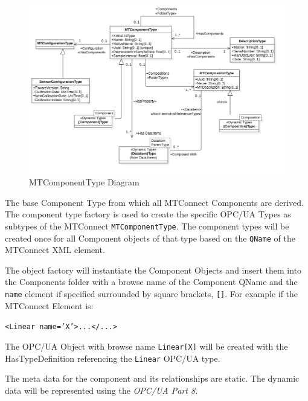\FloatBarrier

\begin{figure}[ht]
  \centering
    \includegraphics[width=1.0\textwidth]{./diagrams/MTComponentType.png}
  \caption{MTComponentType Diagram}
  \label{fig:MTComponentType}
\end{figure}

\FloatBarrier


The base Component Type from which all MTConnect Components are derived. The 
component type factory is used to create the specific OPC/UA Types as subtypes of the 
MTConnect \texttt{MTComponentType}. The component types will be created once for all Component objects 
of that type based on the \texttt{QName} of the MTConnect XML element. 

The object factory will instantiate the Component Objects and insert them into the Components 
folder with a browse name of the Component QName and the \texttt{name} element if specified surrounded 
by square brackets, \texttt{[]}. For example if the MTConnect Element is:

\texttt{<Linear name='X'>...</...>}

The OPC/UA Object with browse name \texttt{Linear[X]} will be created with the HasTypeDefinition 
referencing the \texttt{Linear} OPC/UA type. 

The meta data for the component and its relationships are static. The dynamic data will be 
represented using the \textit{OPC/UA Part 8}.



